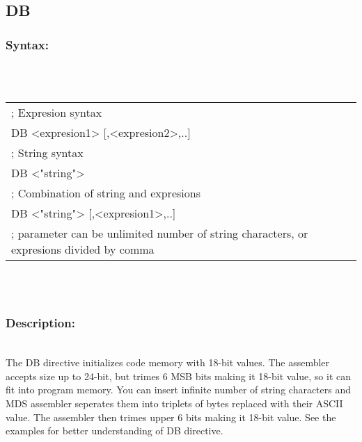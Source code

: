         \subsection{DB}
        \subsubsection{Syntax:}\\
        \\ {
                \texttt{}
                \begin{tabular}[h!]{llll}
                        { \color{highlight_comment} ; Expresion syntax}\\
                        { \color{highlight_directive} DB }
                        { \color{highlight_symbol}   <expresion1>  [,<expresion2>,..]}\\
                        { \color{highlight_comment} ; String syntax}\\
                        { \color{highlight_directive} DB }
                        { \color{highlight_symbol}   <"string">}\\
                        { \color{highlight_comment} ; Combination of string and expresions}\\
                        { \color{highlight_directive} DB }
                        { \color{highlight_symbol}   <"string"> [,<expresion1>,..]}\\
                        { \color{highlight_comment} ; parameter can be unlimited number of string characters, or expresions divided by comma}\\
                \end{tabular}
            }\\
            \\
        \subsubsection{Description:}\\
        The DB directive initializes code memory with 18-bit values. The assembler accepts size up to 24-bit, but trimes 6 MSB bits making it 18-bit value,
        so it can fit into program memory. You can insert infinite number of string characters and MDS assembler seperates them into triplets of bytes replaced
        with their ASCII value. The assembler then trimes upper 6 bits making it 18-bit value.
        See the examples for better understanding of DB directive.
%
